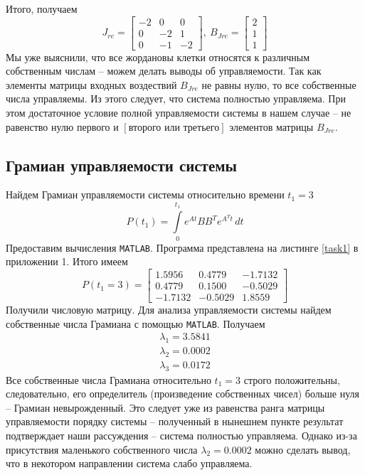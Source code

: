\documentclass[a4paper, 12pt]{article}
\begin{document}
    Итого, получаем
    $$
    J_{re}=\begin{bmatrix}
        -2 &0 &0\\
        0 &-2 &1\\
        0 &-1 &-2
    \end{bmatrix},\
    B_{Jre}=\begin{bmatrix}
        2\\
        1\\
        1
    \end{bmatrix}
    $$
    Мы уже выяснили, что все жордановы клетки относятся к различным собственным числам -- можем делать выводы об управляемости.
    Так как элементы матрицы входных воздествий $B_{Jre}$ не равны нулю, то все собственные числа управляемы. Из этого следует, что
    система полностью управляема. При этом достаточное условие полной управляемости системы в нашем случае -- не равенство нулю
    первого и $\left[\text{второго или третьего}\right]$ элементов матрицы $B_{Jre}$.


    \subsection{Грамиан управляемости системы}
    Найдем Грамиан управляемости системы относительно времени $t_1=3$
    $$P(t_1)=\int\limits_{0}^{t_1}e^{At}BB^Te^{A^Tt}\,dt$$
    Предоставим вычисления \texttt{MATLAB}. Программа представлена на листинге \ref{task1} в приложении 1. Итого имеем
    $$P(t_1=3)=\begin{bmatrix}
    1.5956    &0.4779   &-1.7132\\
    0.4779    &0.1500   &-0.5029\\
   -1.7132   &-0.5029    &1.8559
    \end{bmatrix}$$
    Получили числовую матрицу. Для анализа управляемости системы найдем собственные числа Грамиана с помощью \texttt{MATLAB}. Получаем
    \begin{align*}
    \lambda_1=3.5841\\
    \lambda_2=0.0002\\
    \lambda_3=0.0172
    \end{align*}
    Все собственные числа Грамиана относительно $t_1=3$ строго положительны, следовательно, его определитель (произведение собственных чисел) больше нуля -- Грамиан невырожденный.
    Это следует уже из равенства ранга матрицы управляемости порядку системы -- полученный в нынешнем пункте результат подтверждает наши рассуждения -- система полностью управляема.
    Однако из-за присутствия маленького собственного числа $\lambda_2=0.0002$ можно сделать вывод, что в некотором направлении система слабо управляема.
\end{document}
